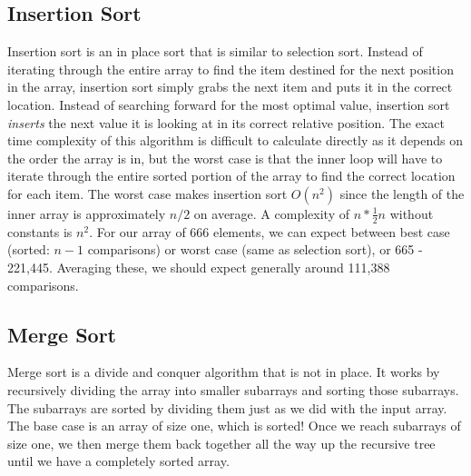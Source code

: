 \documentclass[letterpaper, 10pt]{article}
\begin{document}
\subsection{Insertion Sort}
Insertion sort is an in place sort that is similar to selection sort. Instead of iterating through the entire array to find the item destined for the next position in the array, insertion sort simply grabs the next item and puts it in the correct location. Instead of searching forward for the most optimal value, insertion sort \textit{inserts} the next value it is looking at in its correct relative position. The exact time complexity of this algorithm is difficult to calculate directly as it depends on the order the array is in, but the worst case is that the inner loop will have to iterate through the entire sorted portion of the array to find the correct location for each item.
The worst case makes insertion sort $O(n^2)$ since the length of the inner array is approximately $n/2$ on average. A complexity of $n*\frac{1}{2}n$ without constants is $n^2$. For our array of 666 elements, we can expect between best case (sorted: $n-1$ comparisons) or worst case (same as selection sort), or 665 - 221,445. Averaging these, we should expect generally around 111,388 comparisons.

\subsection{Merge Sort}
Merge sort is a divide and conquer algorithm that is not in place. It works by recursively dividing the array into smaller subarrays and sorting those subarrays. The subarrays are sorted by dividing them just as we did with the input array. The base case is an array of size one, which is sorted! Once we reach subarrays of size one, we then merge them back together all the way up the recursive tree until we have a completely sorted array.
\end{document}
